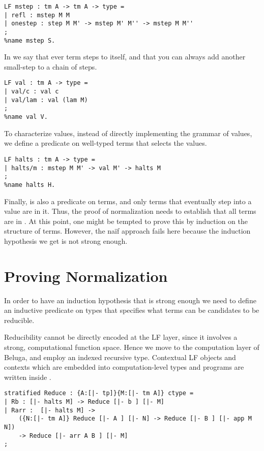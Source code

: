 \begin{lstlisting}
LF mstep : tm A -> tm A -> type =
| refl : mstep M M
| onestep : step M M' -> mstep M' M'' -> mstep M M''
;
%name mstep S.
\end{lstlisting}

In  we say that ever term steps to itself, and that you can
always add another small-step to a chain of steps.

\begin{lstlisting}
LF val : tm A -> type =
| val/c : val c
| val/lam : val (lam M)
;
%name val V.
\end{lstlisting}

To characterize values, instead of directly implementing the grammar
of values, we define a predicate on well-typed terms that selects the
values.

\begin{lstlisting}
LF halts : tm A -> type =
| halts/m : mstep M M' -> val M' -> halts M
;
%name halts H.
\end{lstlisting}

Finally,  is also a predicate on terms, and only terms that
eventually step into a value are in it. Thus, the proof of
normalization needs to establish that all terms are in . At
this point, one might be tempted to prove this by induction on the
structure of terms. However, the na\"if approach fails here because
the induction hypothesis we get is not strong
enough. 

\section{Proving Normalization}

In order to have an induction hypothesis that is strong enough we need
to define an inductive predicate on types that specifies what terms
can be candidates to be reducible.


Reducibility cannot be directly encoded at the LF layer, since it
involves a strong, computational function space. Hence we move to the
computation layer of Beluga, and employ an indexed recursive
type. Contextual LF objects and contexts which are embedded into
computation-level types and programs are written inside \bel{[ ]}.

\begin{lstlisting}
stratified Reduce : {A:[|- tp]}{M:[|- tm A]} ctype =
| Rb : [|- halts M] -> Reduce [|- b ] [|- M]
| Rarr :  [|- halts M] ->
    ({N:[|- tm A]} Reduce [|- A ] [|- N] -> Reduce [|- B ] [|- app M N])
    -> Reduce [|- arr A B ] [|- M]
;
\end{lstlisting}

